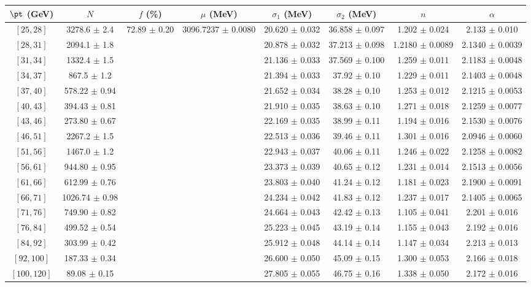 \begin{tabular}{c||c|c|c|c|c|c|c}
$\pt$ (GeV) & $N$ & $f$ (\%) & $\mu$ (MeV) & $\sigma_1$ (MeV) & $\sigma_2$ (MeV) & $n$ & $\alpha$ \\
\hline
$[25, 28]$ & 3278.6 $\pm$ 2.4 & \multirow{17}{*}{72.89 $\pm$ 0.20} & \multirow{17}{*}{3096.7237 $\pm$ 0.0080} & 20.620 $\pm$ 0.032 & 36.858 $\pm$ 0.097 & 1.202 $\pm$ 0.024 & 2.133 $\pm$ 0.010\\
$[28, 31]$ & 2094.1 $\pm$ 1.8 &  &  & 20.878 $\pm$ 0.032 & 37.213 $\pm$ 0.098 & 1.2180 $\pm$ 0.0089 & 2.1340 $\pm$ 0.0039\\
$[31, 34]$ & 1332.4 $\pm$ 1.5 &  &  & 21.136 $\pm$ 0.033 & 37.569 $\pm$ 0.100 & 1.259 $\pm$ 0.011 & 2.1183 $\pm$ 0.0048\\
$[34, 37]$ & 867.5 $\pm$ 1.2 &  &  & 21.394 $\pm$ 0.033 & 37.92 $\pm$ 0.10 & 1.229 $\pm$ 0.011 & 2.1403 $\pm$ 0.0048\\
$[37, 40]$ & 578.22 $\pm$ 0.94 &  &  & 21.652 $\pm$ 0.034 & 38.28 $\pm$ 0.10 & 1.253 $\pm$ 0.012 & 2.1215 $\pm$ 0.0053\\
$[40, 43]$ & 394.43 $\pm$ 0.81 &  &  & 21.910 $\pm$ 0.035 & 38.63 $\pm$ 0.10 & 1.271 $\pm$ 0.018 & 2.1259 $\pm$ 0.0077\\
$[43, 46]$ & 273.80 $\pm$ 0.67 &  &  & 22.169 $\pm$ 0.035 & 38.99 $\pm$ 0.11 & 1.194 $\pm$ 0.016 & 2.1530 $\pm$ 0.0076\\
$[46, 51]$ & 2267.2 $\pm$ 1.5 &  &  & 22.513 $\pm$ 0.036 & 39.46 $\pm$ 0.11 & 1.301 $\pm$ 0.016 & 2.0946 $\pm$ 0.0060\\
$[51, 56]$ & 1467.0 $\pm$ 1.2 &  &  & 22.943 $\pm$ 0.037 & 40.06 $\pm$ 0.11 & 1.246 $\pm$ 0.022 & 2.1258 $\pm$ 0.0082\\
$[56, 61]$ & 944.80 $\pm$ 0.95 &  &  & 23.373 $\pm$ 0.039 & 40.65 $\pm$ 0.12 & 1.231 $\pm$ 0.014 & 2.1513 $\pm$ 0.0056\\
$[61, 66]$ & 612.99 $\pm$ 0.76 &  &  & 23.803 $\pm$ 0.040 & 41.24 $\pm$ 0.12 & 1.181 $\pm$ 0.023 & 2.1900 $\pm$ 0.0091\\
$[66, 71]$ & 1026.74 $\pm$ 0.98 &  &  & 24.234 $\pm$ 0.042 & 41.83 $\pm$ 0.12 & 1.237 $\pm$ 0.017 & 2.1405 $\pm$ 0.0065\\
$[71, 76]$ & 749.90 $\pm$ 0.82 &  &  & 24.664 $\pm$ 0.043 & 42.42 $\pm$ 0.13 & 1.105 $\pm$ 0.041 & 2.201 $\pm$ 0.016\\
$[76, 84]$ & 499.52 $\pm$ 0.54 &  &  & 25.223 $\pm$ 0.045 & 43.19 $\pm$ 0.14 & 1.155 $\pm$ 0.043 & 2.192 $\pm$ 0.016\\
$[84, 92]$ & 303.99 $\pm$ 0.42 &  &  & 25.912 $\pm$ 0.048 & 44.14 $\pm$ 0.14 & 1.147 $\pm$ 0.034 & 2.213 $\pm$ 0.013\\
$[92, 100]$ & 187.33 $\pm$ 0.34 &  &  & 26.600 $\pm$ 0.050 & 45.09 $\pm$ 0.15 & 1.300 $\pm$ 0.053 & 2.166 $\pm$ 0.018\\
$[100, 120]$ & 89.08 $\pm$ 0.15 &  &  & 27.805 $\pm$ 0.055 & 46.75 $\pm$ 0.16 & 1.338 $\pm$ 0.050 & 2.172 $\pm$ 0.016\\
\end{tabular}

